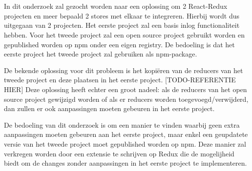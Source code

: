 
%
%

%



\chapter*{}

In dit onderzoek zal gezocht worden naar een oplossing om 2 React-Redux projecten en meer bepaald 2 stores met elkaar te integreren.  Hierbij wordt dus uitgegaan van 2 projecten. Het eerste project zal een basis inlog functionaliteit hebben. Voor het tweede project zal een open source project gebruikt worden en gepublished worden op npm onder een eigen registry. De bedoeling is dat het eerste project het tweede project zal gebruiken als npm-package. 

De bekende oplossing voor dit probleem is het kopiëren van de reducers van het tweede project en deze plaatsen in het eerste project. [TODO-REFERENTIE HIER]
Deze oplossing heeft echter een groot nadeel: als de reducers van het open source project gewijzigd worden of als er reducers worden toegevoegd/verwijderd, dan zullen er ook aanpassingen moeten gebeuren in het eerste project. 

De bedoeling van dit onderzoek is om een manier te vinden waarbij geen extra aanpassingen moeten gebeuren aan het eerste project, maar enkel een geupdatete versie van het tweede project moet gepublished worden op npm.
Deze manier zal verkregen worden door een extensie te schrijven op Redux die de mogelijheid biedt om de changes zonder aanpassingen in het eerste project te implementeren. 
